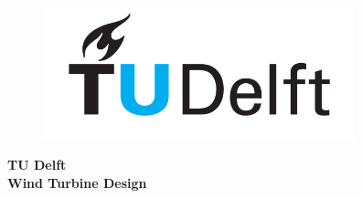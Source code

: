 


    \begin{figure}[H]
    \centering
    \includegraphics[width=9cm]{Images/TU-Delft_logo.png}
    \end{figure}


	\begin{center}
{
    \textbf
    {TU Delft\\
     Wind Turbine Design}
    }
        
\author{Edoardo Bologna [4417526]
\and
Antariksh Dicholkar [4469844]
\and
Linn Forstrom, 4544285
\and 
Davide Passoni, 4542207
\and
Lukas Moy, 4541030
}
 
    
	\end{center}
    
    \vspace{10 mm}

	\begingroup
    	\let\newpage\relax
    	\maketitle
	\endgroup
	
    \vspace{10 mm}
    
    \newpage




    
 

\thispagestyle{empty}

\newpage

\tableofcontents

\newpage

\newpage











%

%

%

%

%







\nocite{*}

%



